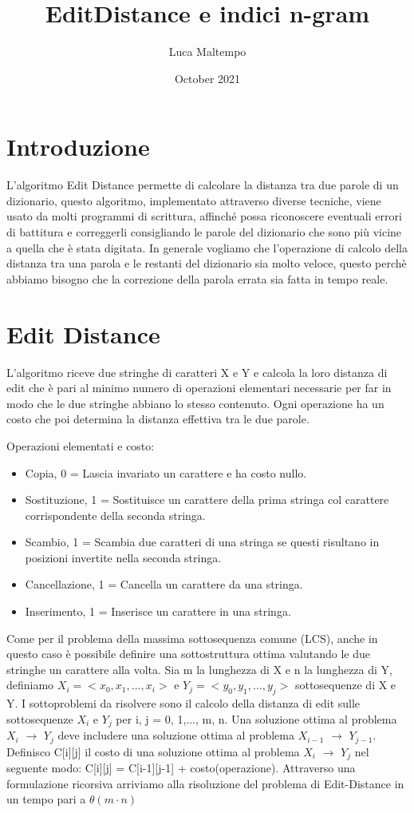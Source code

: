 \documentclass{article}
\title{EditDistance e indici n-gram}
\author{Luca Maltempo}
\date{October 2021}
\begin{document}
\maketitle

\section{Introduzione}
L'algoritmo Edit Distance permette di calcolare la distanza tra due parole di un dizionario, questo algoritmo, implementato attraverso diverse tecniche, viene usato da molti programmi di scrittura, affinché possa riconoscere eventuali errori di battitura e correggerli consigliando le parole del dizionario che sono più vicine a quella che è stata digitata. In generale vogliamo che l'operazione di calcolo della distanza tra una parola e le restanti del dizionario sia molto veloce, questo perchè abbiamo bisogno che la correzione della parola errata sia fatta in tempo reale.
\section{Edit Distance}
L'algoritmo riceve due stringhe di caratteri X e Y e calcola la loro distanza di edit che è pari al minimo numero di operazioni elementari necessarie per far in modo che le due stringhe abbiano lo stesso contenuto. Ogni operazione ha un costo che poi determina la distanza effettiva tra le due parole.

Operazioni elementati e costo:
\begin{itemize}
    \item Copia, 0 = Lascia invariato un carattere e ha costo nullo.
    \item Sostituzione, 1 = Sostituisce un carattere della prima stringa col carattere corrispondente della seconda stringa. 
    \item Scambio, 1 = Scambia due caratteri di una stringa se questi risultano in posizioni invertite nella seconda stringa. 
    \item Cancellazione, 1 = Cancella un carattere da una stringa.
    \item Inserimento, 1 = Inserisce un carattere in una stringa.
\end{itemize}
Come per il problema della massima sottosequenza comune (LCS), anche in questo caso è possibile definire una sottostruttura ottima valutando le due stringhe un carattere alla volta. Sia m la lunghezza di X e n la lunghezza di Y, definiamo $X_{i}= < x_{0}, x_{1},...,x_{i} >$ e  $Y_{j}= < y_{0}, y_{1},...,y_{j} >$ sottosequenze di X e Y.
I sottoproblemi da risolvere sono il calcolo della distanza di edit sulle sottosequenze $X_{i}$ e $Y_{j}$ per i, j = 0, 1,..., m, n.
Una soluzione ottima al problema $X_{i}$ $\rightarrow$ $Y_{j}$ deve includere una soluzione ottima al problema $X_{i-1}$ $\rightarrow$ $Y_{j-1}$. Definisco C[i][j] il costo di una soluzione ottima al problema $X_{i}$ $\rightarrow$ $Y_{j}$ nel seguente modo: C[i][j] = C[i-1][j-1] + costo(operazione). Attraverso una formulazione ricorsiva arriviamo alla risoluzione del problema di Edit-Distance in un tempo pari a $\theta(m \cdot n)$ %
\end{document}
